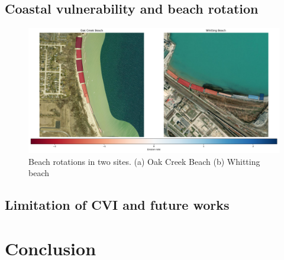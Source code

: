 


\subsection{Coastal vulnerability and beach rotation}
\label{rotation}

\begin{figure}[htbp]
  \centering
  \includegraphics[width=1\textwidth]{chapter5/resources/sites_rotation.png}
  \caption{Beach rotations in two sites. (a) Oak Creek Beach (b) Whitting beach}
  \label{fig:cites_rotations}
\end{figure}

\subsection{Limitation of CVI and future works}
\label{Limitation of CVI}

\section{Conclusion}
\label{c5_Conclusion}